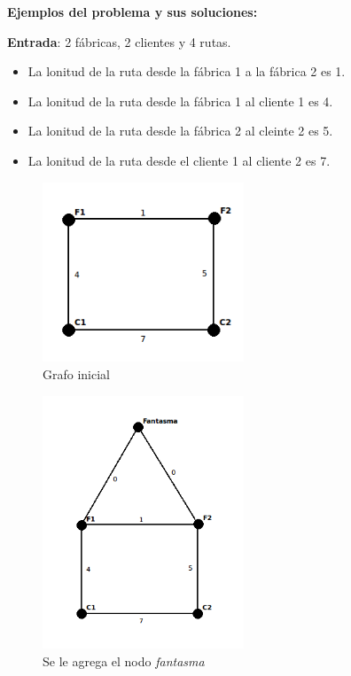 \documentclass[a4paper, 10pt, twoside]{article}
\begin{document}
\textbf{Ejemplos del problema y sus soluciones:}

\textbf{Entrada}: 2 fábricas, 2 clientes y 4 rutas.
\begin{itemize}
\item{La lonitud de la ruta desde la fábrica 1 a la fábrica 2 es 1.}
\item{La lonitud de la ruta desde la fábrica 1 al cliente 1 es 4.}
\item{La lonitud de la ruta desde la fábrica 2 al cleinte 2 es 5.}
\item{La lonitud de la ruta desde el cliente 1 al cliente 2 es 7.}
\end{itemize}

\begin{figure}[H]
\centering
\includegraphics[width=60mm]{../ejemplo_graficos/CosoDosSubconjuntos.png}
\caption{Grafo inicial}
\label{1}
\end{figure} 

\begin{figure}[H]
\centering
\includegraphics[width=60mm]{../ejemplo_graficos/CosoDosSubconjuntosConNodoFantasma.png}
\caption{Se le agrega el nodo \textit{fantasma}}
\label{2}
\end{figure} 
\end{document}
